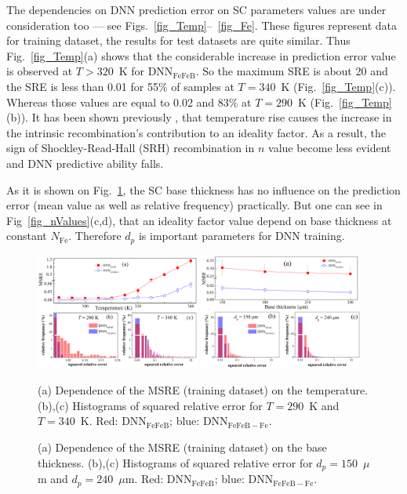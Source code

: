 \documentclass[num-refs]{wiley-article} %
\begin{document}
The dependencies on DNN prediction error on SC parameters values are under consideration too ---
see Figs.~\ref{fig_Temp}--~\ref{fig_Fe}.
These figures represent data for training dataset, the results for test datasets are quite similar.
Thus Fig.~\ref{fig_Temp}(a) shows that the considerable increase in prediction error value is observed at $T>320$~K for DNN$_\mathrm{FeFeB}$.
So the maximum SRE is about 20 and the SRE is less than 0.01 for 55\% of samples at $T=340$~K
(Fig.~\ref{fig_Temp}(c)).
Whereas those values are equal to 0.02 and 83\% at $T=290$~K (Fig.~\ref{fig_Temp}(b)).
It has been shown previously \cite{OlikhJPS}, that temperature rise causes the increase in
the intrinsic recombination's contribution to an ideality factor.
As a result, the sign of Shockley-Read-Hall (SRH) recombination in $n$ value become less evident
and DNN predictive ability falls.

As it is shown on Fig.~\ref{fig_depth}, the SC base thickness has no influence on
the prediction error (mean value as well as relative frequency) practically.
But one can see in Fig~\ref{fig_nValues}(c,d), that an ideality factor value depend on
base thickness at constant $N_\mathrm{Fe}$.
Therefore $d_p$ is important parameters for DNN training.

\begin{figure}[tb]
\centering
\includegraphics[width=0.48\textwidth]{F4} \hfill
\includegraphics[width=0.48\textwidth]{F5} \\
\parbox[t]{0.48\textwidth}
{\caption{(a) Dependence of the MSRE (training dataset) on the temperature.
(b),(c) Histograms of squared relative error for $T=290$~K and $T=340$~K.
Red: DNN$_\mathrm{FeFeB}$; blue: DNN$_\mathrm{FeFeB-Fe}$.
}
\label{fig_Temp}} \hfill
\parbox[t]{0.48\textwidth}{\caption{(a) Dependence of the MSRE (training dataset) on the base thickness.
(b),(c) Histograms of squared relative error for $d_p=150$~$\mu$m and $d_p=240$~$\mu$m.
Red: DNN$_\mathrm{FeFeB}$; blue: DNN$_\mathrm{FeFeB-Fe}$.}
\label{fig_depth}}
\end{figure}
\end{document}

